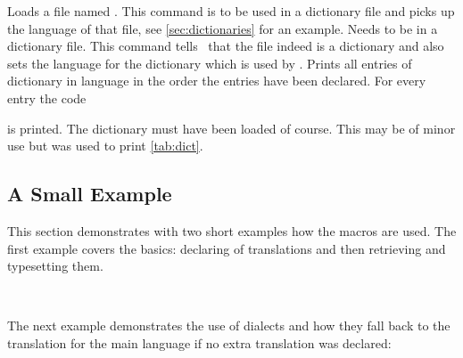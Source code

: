 \documentclass[DIV11,toc=index,toc=bib,numbers=noendperiod]{cnpkgdoc}
\newcommand*\unexpsign{{\tiny\FiveStar}}
\newcommand*\expsign{\textcolor{red}{{\tiny\FiveStar}}}
\renewcommand*\cnpkgdoctriangle{\unexpsign}
\newcommand*\expandable{%
  \def\cnpkgdoctriangle{%
    \expsign
    \gdef\cnpkgdoctriangle{\unexpsign}}}
\begin{document}
\begin{beschreibung}
   Loads a file named .
 \newline
   This command is to be used in a dictionary file and picks up the language
   of that file, see \cref{sec:dictionaries} for an example.
 \newline
   Needs to be in a dictionary file.  This command tells \translations\ that
   the file indeed is a dictionary and also sets the language for the
   dictionary which is used by .
 \expandable{}\newline
   Prints all entries of dictionary  in
   language  in the order the entries have been declared.  For
   every entry the code\par
   \par
   is printed.  The dictionary must have been loaded of course.  This may be
   of minor use but was used to print \cref{tab:dict}.
\end{beschreibung}

\subsection{A Small Example}
This section demonstrates with two short examples how the macros are used.
The first example covers the basics: declaring of translations and then
retrieving and typesetting them.

\begin{beispiel}
 
 \SaveTranslation{}
 \SaveTranslationFor{}

  \kitchen\ 
 \cuisine
\end{beispiel}

The next example demonstrates the use of dialects and how they fall back to
the translation for the main language if no extra translation was declared:

\begin{beispiel}

  \\
  \\
\end{beispiel}
\end{document}
